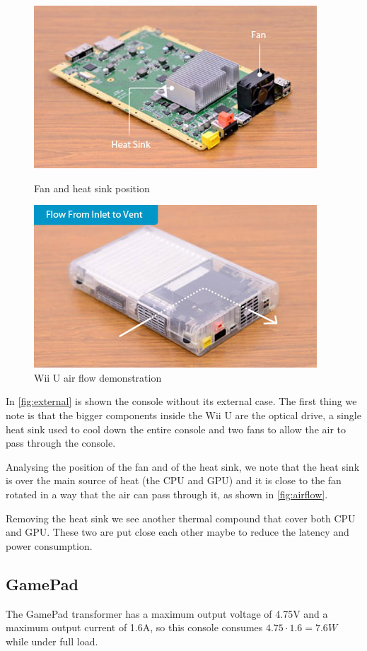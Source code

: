 \documentclass[11pt,a4paper,titlepage]{article}
\begin{document}
		\begin{figure}[ht]
			\centering
			\begin{minipage}{0.45\textwidth}
				\centering
				\includegraphics[width=\textwidth]{fan-heatsink.jpeg}
				\caption{Fan and heat sink position}
				\label{fig:fan-heatsink}
			\end{minipage}
			\begin{minipage}{0.45\textwidth}
				\centering
				\includegraphics[width=\textwidth]{air_flow.jpeg}
				\caption{Wii U air flow demonstration}
				\label{fig:airflow}
			\end{minipage}
		\end{figure}
		In \autoref{fig:external} is shown the console without its external case.
		The first thing we note is that the bigger components inside the Wii U are the optical drive, a single heat sink used to cool down the entire console and two fans to allow the air to pass through the console.

		Analysing the position of the fan and of the heat sink, we note that the heat sink is over the main source of heat (the CPU and GPU) and it is close to the fan rotated in a way that the air can pass through it, as shown in \autoref{fig:airflow}.

		Removing the heat sink we see another thermal compound that cover both CPU and GPU. These two are put close each other maybe to reduce the latency and power consumption.

	\subsection{GamePad}
		The GamePad transformer has a maximum output voltage of 4.75V and a maximum output current of 1.6A, so this console consumes $4.75\cdot 1.6 = 7.6W$ while under full load.


\end{document}
